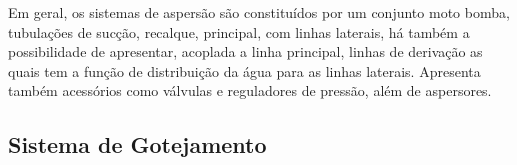 Em geral, os sistemas de aspersão são constituídos por um conjunto moto bomba, tubulações de sucção, recalque, principal, com linhas laterais, há também a possibilidade de apresentar, acoplada a linha principal, linhas de derivação as quais tem a função de distribuição da água para as linhas laterais. Apresenta também acessórios como válvulas e reguladores de pressão, além de aspersores.

\subsection{Sistema de Gotejamento}
